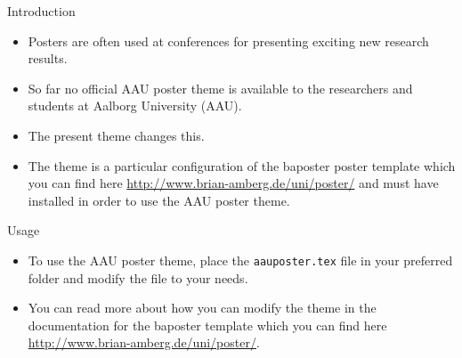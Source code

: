 \documentclass[a0paper,portrait]{baposter}
\newcommand{\alert}[1]{{\color{aaublue1}#1}}
\begin{document}
\begin{poster}
\begin{posterbox}[name=intro,column=0,row=0]{Introduction}
\begin{itemize}
  \item Posters are often used at conferences for presenting exciting new research results.
  \item So far no official AAU poster theme is available to the researchers and students at Aalborg University (AAU).
  \item The present theme changes this.
  \item The theme is a particular configuration of the \alert{baposter} poster template \cite{baposter} which you can find here \url{http://www.brian-amberg.de/uni/poster/} and must have installed in order to use the AAU poster theme.
\end{itemize}
\end{posterbox}

\begin{posterbox}[name=usage,column=0,below=intro]{Usage}
\begin{itemize}
  \item To use the AAU poster theme, place the {\tt aauposter.tex} file in your preferred folder and modify the file to your needs.
  \item You can read more about how you can modify the theme in the documentation for the baposter template which you can find here \url{http://www.brian-amberg.de/uni/poster/}.
\end{itemize}
\end{posterbox}


\end{poster}
\end{document}
